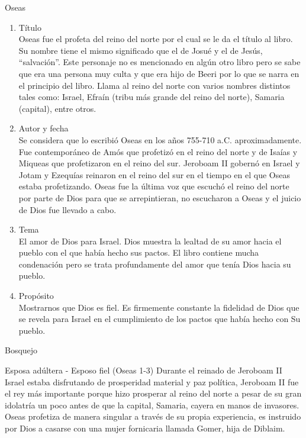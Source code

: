 %
%
\begin{section}{Oseas}
	\begin{enumerate}
		\item Título\\
			Oseas fue el profeta del reino del norte por el cual se le da el título al libro. Su nombre tiene el mismo significado que el de Josué y el de Jesús, ``salvación''. Este personaje no es mencionado en algún otro libro pero se sabe que era una persona muy culta y que era hijo de Beeri por lo que se narra en el principio del libro. Llama al reino del norte con varios nombres distintos tales como: Israel, Efraín (tribu más grande del reino del norte), Samaria (capital), entre otros. 
		\item Autor y fecha\\
			Se considera que lo escribió Oseas en los años 755-710 a.C. aproximadamente. Fue contemporáneo de Amós que profetizó en el reino del norte y de Isaías y Miqueas que profetizaron en el reino del sur. Jeroboam II gobernó en Israel y Jotam y Ezequías reinaron en el reino del sur en el tiempo en el que Oseas estaba profetizando. Oseas fue la última voz que escuchó el reino del norte por parte de Dios para que se arrepintieran, no escucharon a Oseas y el juicio de Dios fue llevado a cabo.
		\item Tema\\
			El amor de Dios para Israel. Dios muestra la lealtad de su amor hacia el pueblo con el que había hecho sus pactos. El libro contiene mucha condenación pero se trata profundamente del amor que tenía Dios hacia su pueblo.
		\item Propósito\\
			Mostrarnos que Dios es fiel. Es firmemente constante la fidelidad de Dios que se revela para Israel en el cumplimiento de los pactos que había hecho con Su pueblo. 
	\end{enumerate}
	\begin{subsection}{Bosquejo}
		\begin{subsubsection}{Esposa adúltera - Esposo fiel (Oseas 1-3)}
			Durante el reinado de Jeroboam II Israel estaba disfrutando de prosperidad material y paz política, Jeroboam II fue el rey más importante porque hizo prosperar al reino del norte a pesar de su gran idolatría un poco antes de que la capital, Samaria, cayera en manos de invasores. Oseas profetiza de manera singular a través de su propia experiencia, es instruido por Dios a casarse con una mujer fornicaria llamada Gomer, hija de Diblaim.\\

\end{subsubsection}
\end{subsection}
\end{section}
